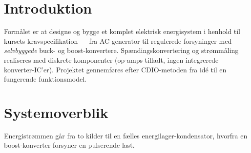 \documentclass[
     title     = {{Elektrisk Energisystem}}
    ,subject   = {{62768 Electrical Energy Systems -- Projekt · DTU · Juni 2026}}
    ,papersize = {{a0paper}}
    ,colcount  = {{3columns}}
    ,highlight = dtured
    ,largecaption
]{dtuposter}
\begin{document}
%
\begin{dtuposterhead}
\end{dtuposterhead}
%
\begin{dtupostercontent}

\section{Introduktion}
Formålet er at designe og bygge et komplet elektrisk energisystem i henhold til
kursets kravspecifikation --- fra AC-generator til regulerede forsyninger med
\emph{selvbyggede} buck- og boost-konvertere. Spændingskonvertering og strømmåling
realiseres med diskrete komponenter (op-amps tilladt, ingen integrerede
konverter-IC'er). Projektet gennemføres efter CDIO-metoden fra idé til en
fungerende funktionsmodel.

\section{Systemoverblik}
Energistrømmen går fra to kilder til en fælles energilager-kondensator, hvorfra en
boost-konverter forsyner en pulserende last.


\end{dtupostercontent}
\end{document}
